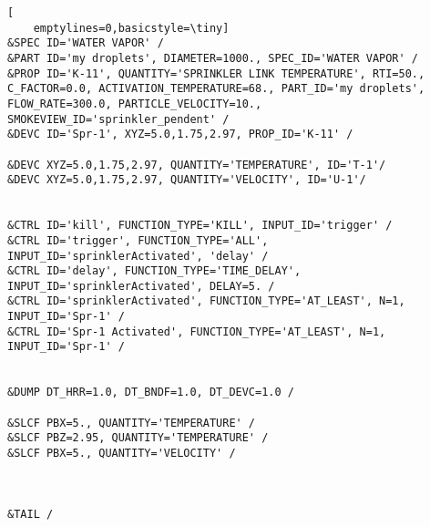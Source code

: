 \begin{lstlisting}[
    emptylines=0,basicstyle=\tiny]
&SPEC ID='WATER VAPOR' /
&PART ID='my droplets', DIAMETER=1000., SPEC_ID='WATER VAPOR' /
&PROP ID='K-11', QUANTITY='SPRINKLER LINK TEMPERATURE', RTI=50., C_FACTOR=0.0, ACTIVATION_TEMPERATURE=68., PART_ID='my droplets', FLOW_RATE=300.0, PARTICLE_VELOCITY=10., SMOKEVIEW_ID='sprinkler_pendent' /
&DEVC ID='Spr-1', XYZ=5.0,1.75,2.97, PROP_ID='K-11' /

&DEVC XYZ=5.0,1.75,2.97, QUANTITY='TEMPERATURE', ID='T-1'/
&DEVC XYZ=5.0,1.75,2.97, QUANTITY='VELOCITY', ID='U-1'/


&CTRL ID='kill', FUNCTION_TYPE='KILL', INPUT_ID='trigger' /
&CTRL ID='trigger', FUNCTION_TYPE='ALL', INPUT_ID='sprinklerActivated', 'delay' /
&CTRL ID='delay', FUNCTION_TYPE='TIME_DELAY', INPUT_ID='sprinklerActivated', DELAY=5. /
&CTRL ID='sprinklerActivated', FUNCTION_TYPE='AT_LEAST', N=1, INPUT_ID='Spr-1' /
&CTRL ID='Spr-1 Activated', FUNCTION_TYPE='AT_LEAST', N=1, INPUT_ID='Spr-1' /


&DUMP DT_HRR=1.0, DT_BNDF=1.0, DT_DEVC=1.0 /

&SLCF PBX=5., QUANTITY='TEMPERATURE' /
&SLCF PBZ=2.95, QUANTITY='TEMPERATURE' /
&SLCF PBX=5., QUANTITY='VELOCITY' /



&TAIL /

    
\end{lstlisting}
